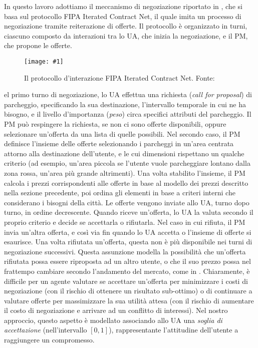 \documentclass[11pt,a4paper,twoside]{article}
\numberwithin{figure}{section}
\numberwithin{equation}{section}
\newcommand{\img}[6]{
    \begin{figure}[#5]
        \centerline{\texttt{[image: \#1]}}
        \caption{#2}
        \label{#3}
    \end{figure}
}
\begin{document}
In questo lavoro adottiamo il meccanismo di negoziazione riportato in \cite{6}, che si basa sul protocollo \textsf{FIPA Iterated Contract Net}, il quale imita un processo di negoziazione tramite reiterazione di offerte.
Il protocollo è organizzato in turni, ciascuno composto da interazioni tra lo UA, che inizia la negoziazione, e il PM, che propone le offerte.

\img{fipa}{Il protocollo d'interazione \textsf{FIPA Iterated Contract Net}. Fonte: \cite{7}}{fig:2}{.7}{ht}

Nel primo turno di negoziazione, lo UA effettua una richiesta (\emph{call for proposal}) di parcheggio, specificando la sua destinazione, l'intervallo temporale in cui ne ha bisogno, e il livello d'importanza (\emph{peso}) circa specifici attributi del parcheggio. Il PM può respingere la richiesta, se non ci sono offerte disponibili, oppure selezionare un'offerta da una lista di quelle possibili.
Nel secondo caso, il PM definisce l'insieme delle offerte selezionando i parcheggi in un'area centrata attorno alla destinazione dell'utente, e le cui dimensioni rispettano un qualche criterio (ad esempio, un'area piccola se l'utente vuole parcheggiare lontano dalla zona rossa, un'area più grande altrimenti). Una volta stabilito l'insieme, il PM calcola i prezzi corrispondenti alle offerte in base al modello dei prezzi descritto nella sezione precedente, poi ordina gli elementi in base a criteri interni che considerano i bisogni della città. Le offerte vengono inviate allo UA, turno dopo turno, in ordine decrescente.
Quando riceve un'offerta, lo UA la valuta secondo il proprio criterio e decide se accettarla o rifiutarla. Nel caso in cui rifiuta, il PM invia un'altra offerta, e così via fin quando lo UA accetta o l'insieme di offerte si esaurisce. Una volta rifiutata un'offerta, questa non è più disponibile nei turni di negoziazione successivi. Questa assunzione modella la possibilità che un'offerta rifiutata possa essere riproposta ad un altro utente, o che il suo prezzo possa nel frattempo cambiare secondo l'andamento del mercato, come in \cite{8}.
Chiaramente, è difficile per un agente valutare se accettare un'offerta per minimizzare i costi di negoziazione (con il rischio di ottenere un risultato sub-ottimo) o di continuare a valutare offerte per massimizzare la sua utilità attesa (con il rischio di aumentare il costo di negoziazione e arrivare ad un conflitto di interessi). Nel nostro approccio, questo aspetto è modellato associando allo UA una \emph{soglia di accettazione} (nell'intervallo $[0, 1]$), rappresentante l'attitudine dell'utente a raggiungere un compromesso.
\end{document}
